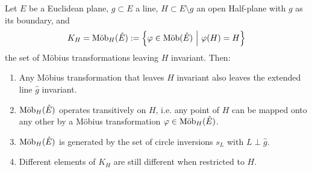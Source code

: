 \begin{proposition}
	Let $E$ be a Euclidean plane, $g \subset E$ a line, $H \subset E \setminus g$ an open Half-plane with $g$ as its boundary, and $$K_H = \textnormal{Möb}_H(\hat E) := \qty{\varphi\in \textnormal{Möb}(\hat E) ~\middle|~\varphi(H) = H}$$ the set of Möbius transformations leaving $H$ invariant. Then:
	\begin{enumerate}
		\item Any Möbius transformation that leaves $H$ invariant also leaves the extended line $\hat g$ invariant.
		\item $\textnormal{Möb}_H(\hat E)$ operates transitively on $H$, i.e. any point of $H$ can be mapped onto any other by a Möbius transformation $\varphi \in \textnormal{Möb}_H(\hat E)$.
		\item $\textnormal{Möb}_H(\hat E)$ is generated by the set of circle inversions $s_L$ with $L \perp \hat g$.
		\item Different elements of $K_H$ are still different when restricted to $H$.
	\end{enumerate}
\end{proposition}

\clearpage

